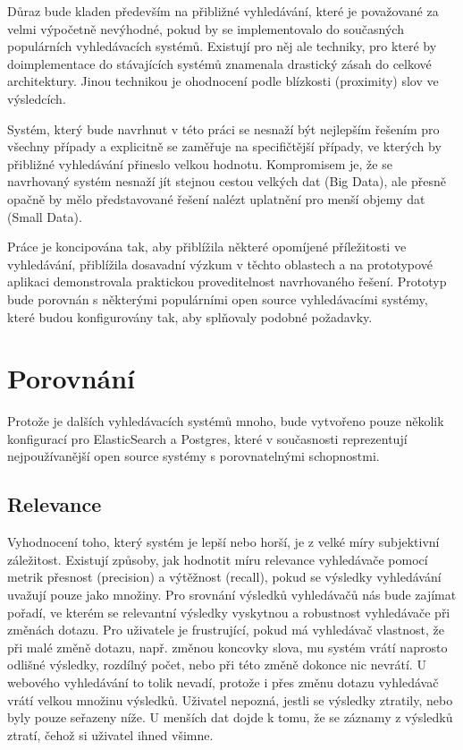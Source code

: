 \documentclass[11pt,letterpaper,oneside,openright]{book}
\begin{document}
Důraz bude kladen především na přibližné vyhledávání, které je považované za
velmi výpočetně nevýhodné, pokud by se implementovalo do současných populárních
vyhledávacích systémů. Existují pro něj ale techniky, pro které by
doimplementace do stávajících systémů znamenala drastický zásah do celkové
architektury. Jinou technikou je ohodnocení podle blízkosti (proximity) slov ve
výsledcích.

Systém, který bude navrhnut v této práci se nesnaží být nejlepším řešením pro
všechny případy a explicitně se zaměřuje na specifičtější případy, ve kterých
by přibližné vyhledávání přineslo velkou hodnotu. Kompromisem je, že se
navrhovaný systém nesnaží jít stejnou cestou velkých dat (Big Data), ale přesně
opačně by mělo představované řešení nalézt uplatnění pro menší objemy dat
(Small Data).

Práce je koncipována tak, aby přiblížila některé opomíjené příležitosti ve
vyhledávání, přiblížila dosavadní výzkum v těchto oblastech a na prototypové
aplikaci demonstrovala praktickou proveditelnost navrhovaného řešení. Prototyp
bude porovnán s některými populárními open source vyhledávacími systémy, které
budou konfigurovány tak, aby splňovaly podobné požadavky.


\section{Porovnání}
Protože je dalších vyhledávacích systémů mnoho, bude vytvořeno pouze několik
konfigurací pro ElasticSearch a Postgres, které v současnosti reprezentují
nejpoužívanější open source systémy s porovnatelnými schopnostmi.

\subsection{Relevance}
Vyhodnocení toho, který systém je lepší nebo horší, je z velké míry subjektivní
záležitost. Existují způsoby, jak hodnotit míru relevance vyhledávače pomocí
metrik přesnost (precision) a výtěžnost (recall), pokud se výsledky vyhledávání
uvažují pouze jako množiny. Pro srovnání výsledků vyhledávačů nás bude zajímat
pořadí, ve kterém se relevantní výsledky vyskytnou a robustnost vyhledávače při
změnách dotazu. Pro uživatele je frustrující, pokud má vyhledávač vlastnost, že
při malé změně dotazu, např.  změnou koncovky slova, mu systém vrátí naprosto
odlišné výsledky, rozdílný počet, nebo při této změně dokonce nic nevrátí. U
webového vyhledávání to tolik nevadí, protože i přes změnu dotazu vyhledávač
vrátí velkou množinu výsledků.  Uživatel nepozná, jestli se výsledky ztratily,
nebo byly pouze seřazeny níže. U menších dat dojde k tomu, že se záznamy z
výsledků ztratí, čehož si uživatel ihned všimne.
\end{document}

